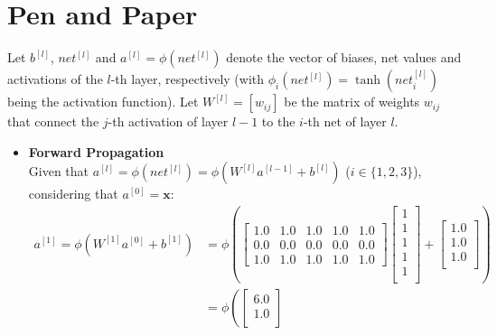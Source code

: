 \documentclass{exam}
\begin{document}
    \section{Pen and Paper}
    \begin{questions}
        \item Let $b^{[l]}$, $net^{[l]}$ and $a^{[l]} = \phi(net^{[l]})$ denote the vector of biases, net values and activations of the $l$-th layer, respectively (with $\phi_i(net^{[l]}) = \tanh(net_i^{[l]})$ being the activation function). Let $W^{[l]} = [w_{ij}]$ be the matrix of weights $w_{ij}$ that connect the $j$-th activation of layer $l-1$ to the $i$-th net of layer $l$.
        \begin{itemize}
            \item \textbf{Forward Propagation} \\
            Given that $a^{[l]} = \phi(net^{[l]}) = \phi(W^{[l]}a^{[l-1]} + b^{[l]})$ ($i \in \{1, 2, 3\}$), considering that $a^{[0]} = \mathbf{x}$:
            \begin{align*}
                a^{[1]} = \phi(W^{[1]}a^{[0]} + b^{[1]}) &= \phi\left(
                \begin{bmatrix}
                    1.0 & 1.0 & 1.0 & 1.0 & 1.0  \\
                    0.0 & 0.0 & 0.0 & 0.0 & 0.0  \\
                    1.0 & 1.0 & 1.0 & 1.0 & 1.0 
                \end{bmatrix} 
                \begin{bmatrix}
                    1  \\
                    1  \\
                    1  \\
                    1  \\
                    1  \\
                \end{bmatrix} + 
                \begin{bmatrix}
                    1.0  \\
                    1.0  \\
                    1.0  \\
                \end{bmatrix} \right) \\
                &= \phi\left(
                \begin{bmatrix}
                    6.0  \\
                    1.0  \\

\end{bmatrix}
\end{align*}
\end{itemize}
\end{questions}
\end{document}
